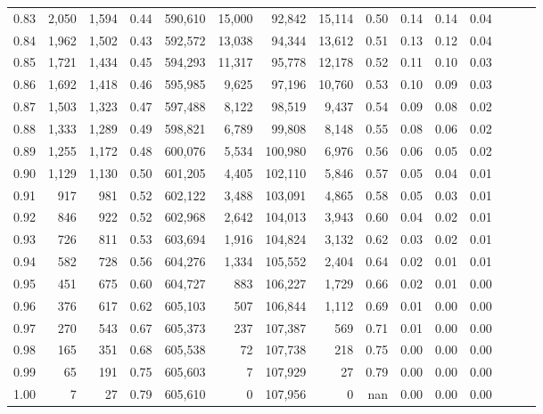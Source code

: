 \begin{tabular}{rrrrrrrrrrrrrrr}
0.83 &   2,050 &  1,594 &  0.44 &  590,610 &   15,000 &   92,842 &   15,114 &  0.50 &  0.14 &  0.14 &      0.04 \\
0.84 &   1,962 &  1,502 &  0.43 &  592,572 &   13,038 &   94,344 &   13,612 &  0.51 &  0.13 &  0.12 &      0.04 \\
0.85 &   1,721 &  1,434 &  0.45 &  594,293 &   11,317 &   95,778 &   12,178 &  0.52 &  0.11 &  0.10 &      0.03 \\
0.86 &   1,692 &  1,418 &  0.46 &  595,985 &    9,625 &   97,196 &   10,760 &  0.53 &  0.10 &  0.09 &      0.03 \\
0.87 &   1,503 &  1,323 &  0.47 &  597,488 &    8,122 &   98,519 &    9,437 &  0.54 &  0.09 &  0.08 &      0.02 \\
0.88 &   1,333 &  1,289 &  0.49 &  598,821 &    6,789 &   99,808 &    8,148 &  0.55 &  0.08 &  0.06 &      0.02 \\
0.89 &   1,255 &  1,172 &  0.48 &  600,076 &    5,534 &  100,980 &    6,976 &  0.56 &  0.06 &  0.05 &      0.02 \\
0.90 &   1,129 &  1,130 &  0.50 &  601,205 &    4,405 &  102,110 &    5,846 &  0.57 &  0.05 &  0.04 &      0.01 \\
0.91 &     917 &    981 &  0.52 &  602,122 &    3,488 &  103,091 &    4,865 &  0.58 &  0.05 &  0.03 &      0.01 \\
0.92 &     846 &    922 &  0.52 &  602,968 &    2,642 &  104,013 &    3,943 &  0.60 &  0.04 &  0.02 &      0.01 \\
0.93 &     726 &    811 &  0.53 &  603,694 &    1,916 &  104,824 &    3,132 &  0.62 &  0.03 &  0.02 &      0.01 \\
0.94 &     582 &    728 &  0.56 &  604,276 &    1,334 &  105,552 &    2,404 &  0.64 &  0.02 &  0.01 &      0.01 \\
0.95 &     451 &    675 &  0.60 &  604,727 &      883 &  106,227 &    1,729 &  0.66 &  0.02 &  0.01 &      0.00 \\
0.96 &     376 &    617 &  0.62 &  605,103 &      507 &  106,844 &    1,112 &  0.69 &  0.01 &  0.00 &      0.00 \\
0.97 &     270 &    543 &  0.67 &  605,373 &      237 &  107,387 &      569 &  0.71 &  0.01 &  0.00 &      0.00 \\
0.98 &     165 &    351 &  0.68 &  605,538 &       72 &  107,738 &      218 &  0.75 &  0.00 &  0.00 &      0.00 \\
0.99 &      65 &    191 &  0.75 &  605,603 &        7 &  107,929 &       27 &  0.79 &  0.00 &  0.00 &      0.00 \\
1.00 &       7 &     27 &  0.79 &  605,610 &        0 &  107,956 &        0 &   nan &  0.00 &  0.00 &      0.00 \\
\bottomrule
\end{tabular}
